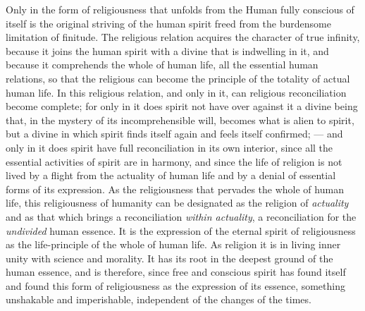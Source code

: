 \documentclass[12pt,a4paper,openany]{book}
\newcommand{\opage}[1]{\marginnote{\footnotesize\textit{[#1]}}}
\begin{document}
Only in the form of religiousness that unfolds from the
Human fully conscious of itself is the original striving of the human spirit
freed from the burdensome limitation of finitude.
The religious relation acquires the character of true infinity,
because it joins the human spirit with a divine that
is indwelling in it, and because it comprehends the whole of human life, all
the essential human relations, so that the religious can
become the principle of the totality of actual human life.
\opage{509}In this religious relation, and only in it, can religious
reconciliation become complete; for only in it does spirit not have
over against it a divine being that, in the mystery of its incomprehensible
will, becomes what is alien to spirit, but a
divine in which spirit finds itself again and feels itself
confirmed; --- and only in it does spirit have full reconciliation
in its own interior, since all the essential activities of spirit
are in harmony, and since the life of religion is not lived by a
flight from the actuality of human life and by a denial
of essential forms of its expression. As the religiousness that
pervades the whole of human life, this religiousness of humanity
can be designated as the religion of \emph{actuality} and
as that which brings a reconciliation \emph{within actuality},
a reconciliation for the \emph{undivided} human essence. It
is the expression of the eternal spirit of religiousness as the life-principle
of the whole of human life. As religion it is in living
inner unity with science and morality. It has its
root in the deepest ground of the human essence, and is therefore, since
free and conscious spirit has found itself and found
this form of religiousness as the expression of its essence, something
unshakable and imperishable, independent of the changes of the times.
\end{document}
